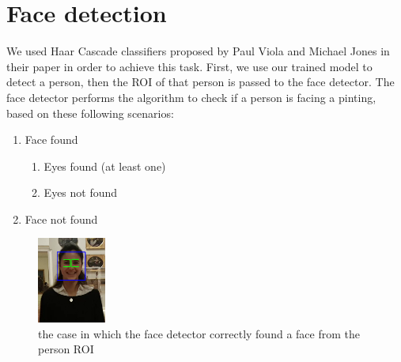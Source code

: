 \section{Face detection}
We used Haar Cascade classifiers proposed by Paul Viola and Michael Jones in their paper \cite{haar_cascade} in order to achieve this task. First, we use our trained model to detect a person, then the ROI of that person is passed to the face detector. The face detector performs the algorithm to check if a person is facing a pinting, based on these following scenarios:
\begin{enumerate}[label=\alph*)]
	\item Face found
    \begin{enumerate}[label=(\roman*)]
        \item \label{Eyes found} Eyes found (at least one)
        \item \label{Eyes not found} Eyes not found 
    \end{enumerate}
	\item \label{Face not found} Face not found
\end{enumerate}

\begin{figure}[h!]
    \centering
        \includegraphics[width=0.2\textwidth]{pictures/face_detection/face_det2}
    \caption{the case in which the face detector correctly found a face from the person ROI}
    \label{fig:Eyes}
\end{figure}

